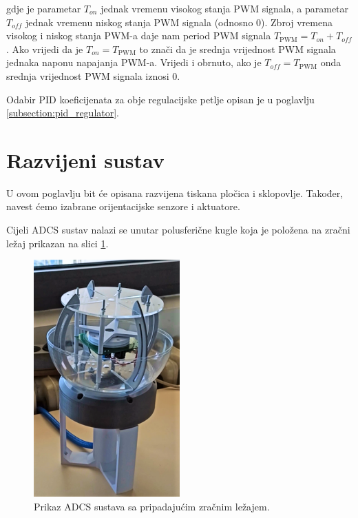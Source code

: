 \documentclass[times, utf8, diplomski, numeric]{templates/template}
\begin{document}
{{{{                gdje je parametar $T_{on}$ jednak vremenu visokog stanja PWM signala, a parametar $T_{off}$ jednak vremenu niskog stanja PWM signala (odnosno 0). Zbroj vremena visokog i niskog stanja PWM-a daje nam period PWM signala $T_{\text{PWM}} = T_{on} + T_{off}$. Ako vrijedi da je $T_{on}=T_{\text{PWM}}$ to znači da je srednja vrijednost PWM signala jednaka naponu napajanja PWM-a. Vrijedi i obrnuto, ako je $T_{off}=T_{\text{PWM}}$ onda srednja vrijednost PWM signala iznosi 0.

                Odabir PID koeficijenata za obje regulacijske petlje opisan je u poglavlju \ref{subsection:pid_regulator}.
            }
        }
    }

    \section{Razvijeni sustav}{
        U ovom poglavlju bit će opisana razvijena tiskana pločica i sklopovlje. Također, navest ćemo izabrane orijentacijske senzore i aktuatore.

        Cijeli ADCS sustav nalazi se unutar polusferične kugle koja je položena na zračni ležaj prikazan na slici \ref{fig:slika_sustava}.

        \begin{figure}[htb]
        \centering
        \includegraphics[width=0.5\textwidth]{images/slika_sustava.png}
        \caption{Prikaz ADCS sustava sa pripadajućim zračnim ležajem.}
        \label{fig:slika_sustava}
        \end{figure}

}}
\end{document}
